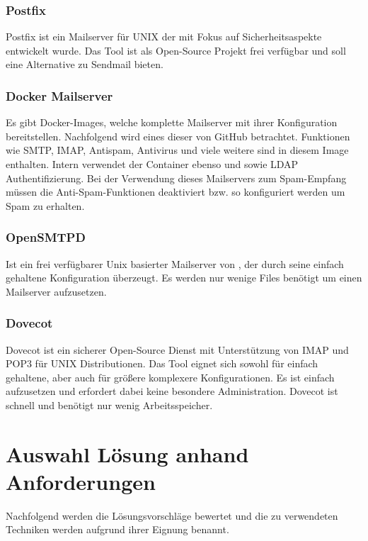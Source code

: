 \documentclass[a4paper,11pt,singlespacing]{article}
\begin{document}
		\subsubsection{Postfix}\label{sec:Postfix}
			Postfix ist ein Mailserver für UNIX der mit Fokus auf Sicherheitsaspekte entwickelt wurde.
			Das Tool ist als Open-Source Projekt frei verfügbar und soll eine Alternative zu Sendmail bieten.
			\cite{postfix}

		\subsubsection{Docker Mailserver}\label{sec:FullstackDockerMailserver}
			Es gibt Docker-Images, welche komplette Mailserver mit ihrer Konfiguration bereitstellen.
			Nachfolgend wird eines dieser von GitHub \cite{fullstackDockerMailserver} betrachtet.
			Funktionen wie SMTP, IMAP, Antispam, Antivirus und viele weitere sind in diesem Image enthalten.
			Intern verwendet der Container ebenso  und  sowie LDAP Authentifizierung.
			Bei der Verwendung dieses Mailservers zum Spam-Empfang müssen die Anti-Spam-Funktionen deaktiviert bzw. so konfiguriert werden um Spam zu erhalten.

		\subsubsection{OpenSMTPD}\label{sec:OpenSMTPD}
			Ist ein frei verfügbarer Unix basierter Mailserver von , der durch seine einfach gehaltene Konfiguration überzeugt.
			Es werden nur wenige Files benötigt um einen Mailserver aufzusetzen.

		\subsubsection{Dovecot}\label{sec:Dovecot}
			Dovecot ist ein sicherer Open-Source Dienst mit Unterstützung von IMAP und POP3 für UNIX Distributionen.
			Das Tool eignet sich sowohl für einfach gehaltene, aber auch für grö{\ss}ere komplexere Konfigurationen.
			Es ist einfach aufzusetzen und erfordert dabei keine besondere Administration.
			Dovecot ist schnell und benötigt nur wenig Arbeitsspeicher. \cite{dovecot}

\newpage


\section{Auswahl Lösung anhand Anforderungen}\label{sec:AuswahlLösungAnhandAnforderungen}
	Nachfolgend werden die Lösungsvorschläge bewertet und die zu verwendeten Techniken werden aufgrund ihrer Eignung benannt.
\end{document}
